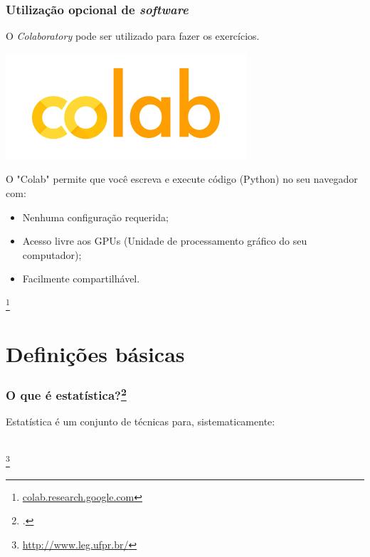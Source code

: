 \documentclass[11pt]{beamer}
\newcommand\blfootnote[1]{%
  \begingroup
  \renewcommand\thefootnote{}\footnote{#1}%
  \addtocounter{footnote}{-1}%
  \endgroup
}
\begin{document}
\begin{frame}
\frametitle{Utilização opcional de \textit{software}}
O \textit{Colaboratory} pode ser utilizado para fazer os exercícios.

\begin{center}\includegraphics[width=0.5\linewidth]{figs/colab.png} \end{center}

O "Colab" permite que você escreva e execute código (Python) no seu navegador com:
\begin{itemize}
\item Nenhuma configuração requerida;
\item Acesso livre aos GPUs (Unidade de processamento gráfico do seu computador);
\item Facilmente compartilhável.
\end{itemize} 

\blfootnote{\url{colab.research.google.com}}
\end{frame}


\section{Definições básicas}
\begin{frame}
\frametitle{O que é estatística?\footcite{magalhaes2002noccoes}}
Estatística é um conjunto de técnicas para, sistematicamente:
\\~\\
  \begin{itemize}
  \end{itemize}
\blfootnote{\url{http://www.leg.ufpr.br/}}
\end{frame}
\end{document}
